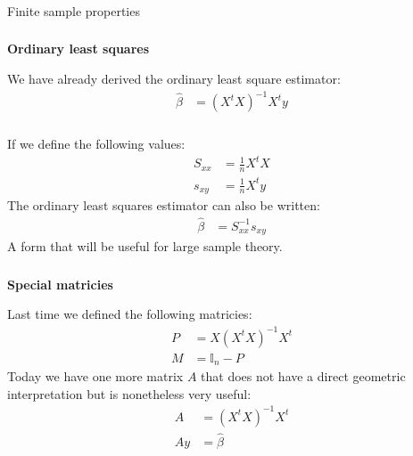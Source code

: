 \begin{frame}[fragile] \frametitle{}

\begin{flushright}
{\color{yaleblue}\sc\fontsize{1cm}{0cm}\selectfont Finite sample properties}
\end{flushright}

\end{frame}


\begin{frame}[fragile] \frametitle{}

{\bf Ordinary least squares}

We have already derived the ordinary least square estimator:
\begin{align*}
\widehat{\beta} &= (X^t X)^{-1} X^t y
\end{align*}

\end{frame}


\begin{frame}[fragile] \frametitle{}

If we define the following values:
\begin{align*}
S_{xx} &= \frac{1}{n} X^t X \\
s_{xy} &= \frac{1}{n} X^t y
\end{align*}
The ordinary least squares estimator can also be written:
\begin{align*}
\widehat{\beta} &=  S_{xx}^{-1} s_{xy}
\end{align*}
A form that will be useful for large sample theory.

\end{frame}


\begin{frame}[fragile] \frametitle{}

{\bf Special matricies}

Last time we defined the following matricies:
\begin{align*}
P &= X (X^t X)^{-1} X^t \\
M &= \mathbb{I}_n - P
\end{align*}
\pause Today we have one more matrix $A$ that does
not have a direct geometric interpretation but is
nonetheless very useful:
\begin{align*}
A &= (X^t X)^{-1} X^t \\
Ay &= \widehat{\beta}
\end{align*}

\end{frame}

